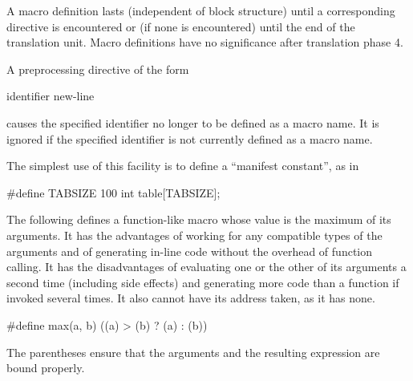\pnum
A macro definition lasts
(independent of block structure)
until a corresponding
directive is encountered or
(if none is encountered)
until the end of the translation unit.
Macro definitions have no significance after translation phase 4.

\pnum
A preprocessing directive of the form

\begin{ncsimplebnf}
 identifier new-line
%
\end{ncsimplebnf}

causes the specified identifier no longer to be defined as a macro name.
It is ignored if the specified identifier is not currently defined as
a macro name.

\pnum
\begin{example}
The simplest use of this facility is to define a ``manifest constant'',
as in
\begin{codeblock}
#define TABSIZE 100
int table[TABSIZE];
\end{codeblock}
\end{example}

\pnum
\begin{example}
The following defines a function-like
macro whose value is the maximum of its arguments.
It has the advantages of working for any compatible types of the arguments
and of generating in-line code without the overhead of function calling.
It has the disadvantages of evaluating one or the other of its arguments
a second time
(including
%
side effects)
and generating more code than a function if invoked several times.
It also cannot have its address taken,
as it has none.

\begin{codeblock}
#define max(a, b) ((a) > (b) ? (a) : (b))
\end{codeblock}

The parentheses ensure that the arguments and
the resulting expression are bound properly.
\end{example}

